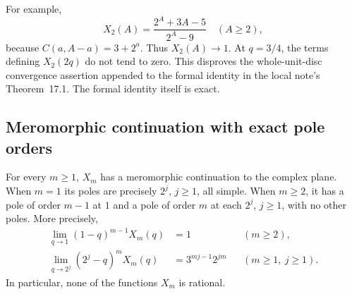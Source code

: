 For example,
\[
 X_2(A)=\frac{2^A+3A-5}{2^A-9}\quad(A\ge2),
\]
because $C(a,A-a)=3+2^a$.  Thus $X_2(A)\to1$.  At $q=3/4$, the
terms defining $X_2(2q)$ do not tend to zero.  This disproves the
whole-unit-disc convergence assertion appended to the formal identity
in the local note's Theorem~17.1.  The formal identity itself is exact.

\subsection{Meromorphic continuation with exact pole orders}

\begin{theorem}\label{thm:packet-dyadic-poles}
For every $m\ge1$, $X_m$ has a meromorphic continuation to the complex
plane.  When $m=1$ its poles are precisely $2^j$, $j\ge1$, all simple.
When $m\ge2$, it has a pole of order $m-1$ at $1$ and a pole of order
$m$ at each $2^j$, $j\ge1$, with no other poles.  More precisely,
\begin{align}
 \lim_{q\to1}(1-q)^{m-1}X_m(q)&=1 &&(m\ge2),
 \label{eq:packet-pole-one}\\
 \lim_{q\to2^j}(2^j-q)^mX_m(q)&=3^{mj-1}2^{jm}
 &&(m\ge1,\ j\ge1).
 \label{eq:packet-dyadic-leading}
\end{align}
In particular, none of the functions $X_m$ is rational.
\end{theorem}
